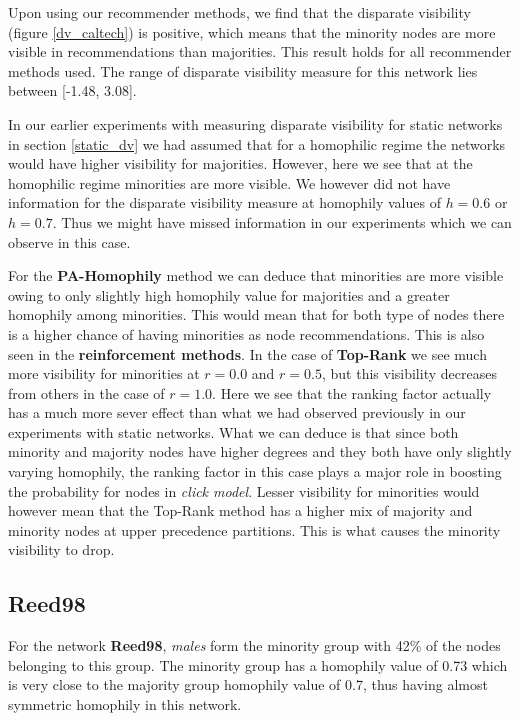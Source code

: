 Upon using our recommender methods, we find that the disparate visibility (figure \ref{dv_caltech}) is positive, which means that the minority nodes are more visible in recommendations than majorities. This result holds for all recommender methods used. The range of disparate visibility measure for this network lies between [-1.48, 3.08]. 

In our earlier experiments with measuring disparate visibility for static networks in section \ref{static_dv} we had assumed that for a homophilic regime the networks would have higher visibility for majorities. However, here we see that at the homophilic regime minorities are more visible. We however did not have information for the disparate visibility measure at homophily values of $h=0.6$ or $h=0.7$. Thus we might have missed information in our experiments which we can observe in this case. 

For the \textbf{PA-Homophily} method we can deduce that minorities are more visible owing to only slightly high homophily value for majorities and a greater homophily among minorities. This would mean that for both type of nodes there is a higher chance of having minorities as node recommendations. This is also seen in the \textbf{reinforcement methods}. In the case of \textbf{Top-Rank} we see much more visibility for minorities at $r=0.0$ and $r=0.5$, but this visibility decreases from others in the case of $r=1.0$. Here we see that the ranking factor actually has a much more sever effect than what we had observed previously in our experiments with static networks. What we can deduce is that since both minority and majority nodes have higher degrees and they both have only slightly varying homophily, the ranking factor in this case plays a major role in boosting the probability for nodes in \textit{click model}. Lesser visibility for minorities would however mean that the Top-Rank method has a higher mix of majority and minority nodes at upper precedence partitions. This is what causes the minority visibility to drop.

\subsection{Reed98}

For the network \textbf{Reed98}, \textit{males} form the minority group with 42\% of the nodes belonging to this group. The minority group has a homophily value of 0.73 which is very close to the majority group homophily value of 0.7, thus having almost symmetric homophily in this network. 

